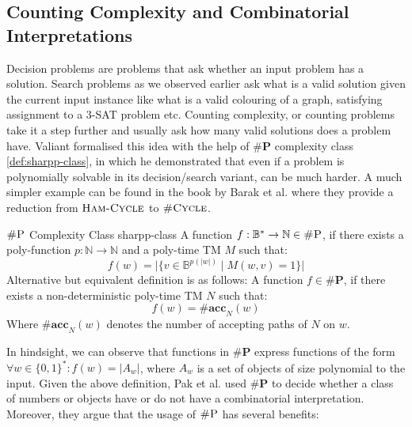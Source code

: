 


\subsection{Counting Complexity and Combinatorial Interpretations}

Decision problems are problems that ask whether an input problem has a solution.
Search problems as we observed earlier ask what is a valid solution given the current input instance like
what is a valid colouring of a graph, satisfying assignment to a 3-SAT problem etc. Counting complexity,
or counting problems take it a step further and usually ask how many valid solutions does a problem have.
Valiant formalised this idea with the help of $\textbf{\#P}$ complexity class \ref{def:sharpp-class}, in which
he demonstrated that even if a problem is polynomially solvable in its decision/search variant, can be
much harder. A much simpler example can be found in the book by Barak et al. \cite{arora_ComputationalComplexityModern_2009}
where they provide a reduction from $\textsc{Ham-Cycle}$ to $\textsc{\#Cycle}$.


\begin{definitionbox}{\(\textnormal{\textsc{\#P}}\) Complexity Class \cite{valiant_ComplexityComputingPermanent_1979}}{sharpp-class}
    \label{def:sharpp-class}
    A function \(f: \mathbb{B}^* \to \mathbb{N} \in \textsc{\#P}\), if there exists a
    poly-function \(p : \mathbb{N} \to \mathbb{N}\) and a poly-time TM \(M\) such that:
    \[
        f(w) = \Big|\Big\{v \in \mathbb{B}^{p(|w|)} \mid M(w, v) =1 \Big\}\Big|
    \]
    Alternative but equivalent definition is as follows: A function $f \in \textbf{\#P}$,
    if there exists a non-deterministic poly-time TM $N$ such that:
    $$
        f(w) = \textbf{\#acc}_N(w)
    $$
    Where $\textbf{\#acc}_N(w)$ denotes the number of accepting paths of $N$ on $w$.
\end{definitionbox}

In hindsight, we can observe that functions in $\textbf{\#P}$ express functions of the form
$\forall w \in \{0,1\}^*: f(w) = |A_w|$, where $A_w$ is a set of objects of size
polynomial to the input.
Given the above definition, Pak et al. \cite{pak_WhatCombinatorialInterpretation_2022, ikenmeyer_PositivitySymmetricGroup_2024}
used $\textbf{\#P}$ to decide whether a class of numbers or objects have or do not have a combinatorial interpretation.
Moreover, they argue that the usage of $\textsc{\#P}$ has several benefits:


